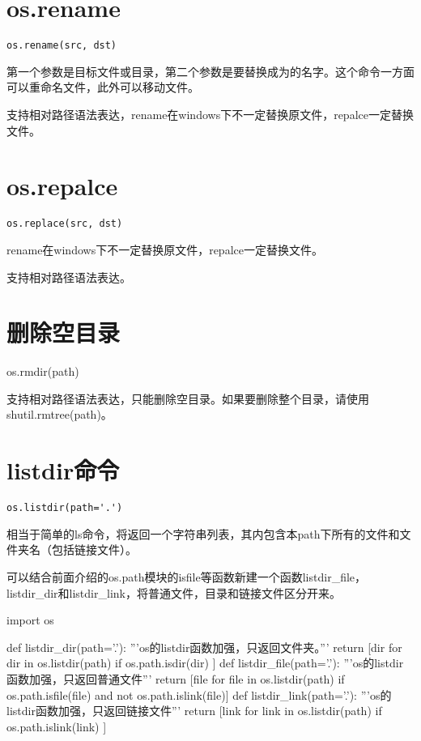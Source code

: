 \documentclass[12pt,oneside]{book}
\begin{document}
\begin{common-format}
\section{os.rename}
\begin{Verbatim}
os.rename(src, dst)
\end{Verbatim}

第一个参数是目标文件或目录，第二个参数是要替换成为的名字。这个命令一方面可以重命名文件，此外可以移动文件。
 
支持相对路径语法表达，rename在windows下不一定替换原文件，repalce一定替换文件。

\section{os.repalce}
\begin{Verbatim}
os.replace(src, dst)
\end{Verbatim}

rename在windows下不一定替换原文件，repalce一定替换文件。

支持相对路径语法表达。

\section{删除空目录}
os.rmdir(path)

支持相对路径语法表达，只能删除空目录。如果要删除整个目录，请使用shutil.rmtree(path)。

\section{listdir命令}
\begin{Verbatim}
os.listdir(path='.')
\end{Verbatim}

相当于简单的ls命令，将返回一个字符串列表，其内包含本path下所有的文件和文件夹名（包括链接文件）。

可以结合前面介绍的os.path模块的isfile等函数新建一个函数listdir\_{}file，listdir\_{}dir和listdir\_{}link，将普通文件，目录和链接文件区分开来。

\begin{tcbpython}[]
import os

def listdir_dir(path='.'):
    '''os的listdir函数加强，只返回文件夹。'''
    return [dir for dir in os.listdir(path) if os.path.isdir(dir) ]
def listdir_file(path='.'):
    '''os的listdir函数加强，只返回普通文件'''
    return [file for file in os.listdir(path) if os.path.isfile(file)
     and  not os.path.islink(file)]
def listdir_link(path='.'):
    '''os的listdir函数加强，只返回链接文件'''
    return [link for link in os.listdir(path) if os.path.islink(link) ]
\end{tcbpython}





\end{common-format}
\end{document}
